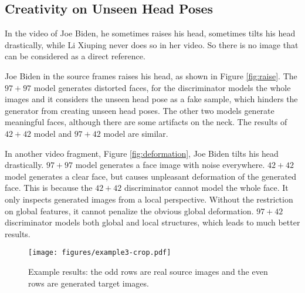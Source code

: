 \documentclass[letterpaper]{article} %
\newcommand{\zhiming}[1]{{\bf \color{blue} [Zhiming says: #1]}}
\begin{document}
	\subsection{Creativity on Unseen Head Poses}
	In the video of Joe Biden, he sometimes raises his head, sometimes tilts his head drastically,  while Li Xiuping never does so in her video. So there is no image that can be considered as a direct reference. 
	
	Joe Biden in the source frames raises his head, as shown in Figure \ref{fig:raise}. The $97+97$ model generates distorted faces, for the discriminator models the whole images and it considers the unseen head pose as a fake sample, which hinders the generator from creating unseen head poses. The other two models generate meaningful faces, although there are some artifacts on the neck. The results of $42+42$ model and $97+42$ model are similar.
	
	In another video fragment, Figure \ref{fig:deformation}, Joe Biden tilts his head drastically. $97+97$ model generates a face image with noise everywhere. $42+42$ model generates a clear face, but causes unpleasant deformation of the generated face. This is because the $42+42$ discriminator cannot model the whole face. It only inspects generated images from a local perspective. Without the restriction on global features, it cannot penalize the obvious global deformation. $97+42$ discriminator models both global and local structures, which leads to much better results.
	
	\begin{figure*}[t]
		\centering
		\vspace{0pt}
		\texttt{[image: figures/example3-crop.pdf]}\\
		\caption{%
			Example results: the odd rows are real source images and the even rows are generated target images.} \label{fig:example}
		\vspace{0pt}	
	\end{figure*}
	
\end{document}
